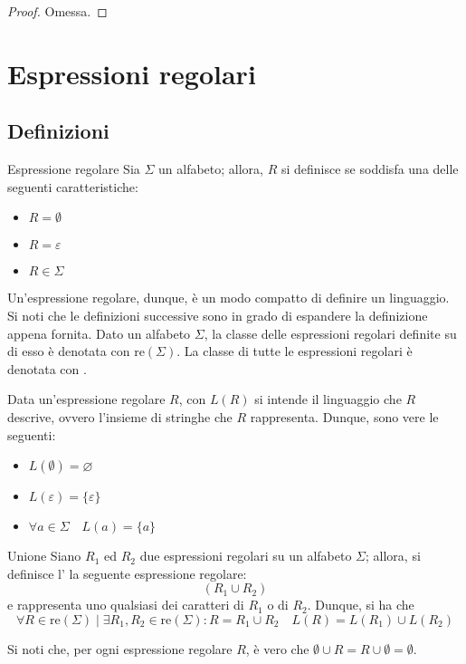 \documentclass[a4paper, 12pt]{report}
\begin{document}
    \begin{proof}
        Omessa.
    \end{proof}

    \section{Espressioni regolari}

    \subsection{Definizioni}

    \begin{frameddefn}{Espressione regolare}
        Sia $\Sigma$ un alfabeto; allora, $R$ si definisce  se soddisfa una delle seguenti caratteristiche:

        \begin{itemize}
            \item $R = \emptyset$
            \item $R = \varepsilon$
            \item $R \in \Sigma$
        \end{itemize}

        Un'espressione regolare, dunque, è un modo compatto di definire un linguaggio. Si noti che le definizioni successive sono in grado di espandere la definizione appena fornita. Dato un alfabeto $\Sigma$, la classe delle espressioni regolari definite su di esso è denotata con $\mathrm{re}(\Sigma)$. La classe di tutte le espressioni regolari è denotata con \REX.

        Data un'espressione regolare $R$, con $L(R)$ si intende il linguaggio che $R$ descrive, ovvero l'insieme di stringhe che $R$ rappresenta. Dunque, sono vere le seguenti:

        \begin{itemize}
            \item $L(\emptyset) = \varnothing$
            \item $L(\varepsilon) = \{ \varepsilon \}$
            \item $\forall a \in \Sigma \quad L(a) = \{ a\}$
        \end{itemize}
    \end{frameddefn}

    \begin{frameddefn}{Unione}
        Siano $R_1$ ed $R_2$ due espressioni regolari su un alfabeto $\Sigma$; allora, si definisce l' la seguente espressione regolare: $$(R_1 \cup R_2)$$ e rappresenta uno qualsiasi dei caratteri di $R_1$ o di $R_2$. Dunque, si ha che $$\forall R \in \mathrm{re}(\Sigma) \mid \exists R_1, R_2 \in \mathrm{re}(\Sigma) : R = R_1 \cup R_2 \quad L(R) = L(R_1) \cup L(R_2)$$

        Si noti che, per ogni espressione regolare $R$, è vero che $\emptyset \cup R = R \cup \emptyset = \emptyset$.
    \end{frameddefn}
\end{document}
